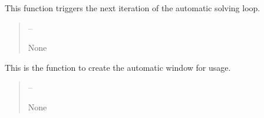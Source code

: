 \documentclass[letterpaper,11pt,english]{sphinxmanual}
\begin{document}
\begin{savenotes}
\begin{fulllineitems}

\begin{savenotes}\begin{fulllineitems}
\label{\detokenize{code/opihiexarata.gui.automatic:opihiexarata.gui.automatic.OpihiAutomaticWindow.trigger_next_image_solve}}
\pysigstartsignatures
{}
\pysigstopsignatures
\sphinxAtStartPar
This function triggers the next iteration of the automatic solving
loop.
\begin{quote}\begin{description}
\sphinxAtStartPar
{} – 

\sphinxAtStartPar
None

\end{description}\end{quote}

\end{fulllineitems}\end{savenotes}


\end{fulllineitems}\end{savenotes}


\begin{savenotes}\begin{fulllineitems}
\label{\detokenize{code/opihiexarata.gui.automatic:opihiexarata.gui.automatic.start_automatic_window}}
\pysigstartsignatures
{}
\pysigstopsignatures
\sphinxAtStartPar
This is the function to create the automatic window for usage.
\begin{quote}\begin{description}
\sphinxAtStartPar
{} – 

\sphinxAtStartPar
None

\end{description}\end{quote}

\end{fulllineitems}\end{savenotes}
\end{document}
